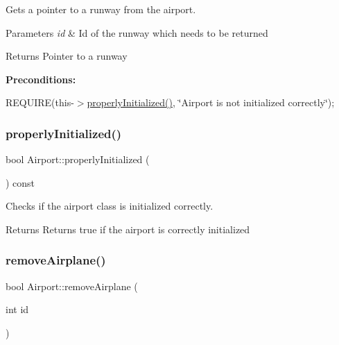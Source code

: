Gets a pointer to a runway from the airport. 


\begin{DoxyParams}{Parameters}
{\em id} & Id of the runway which needs to be returned \\
\hline
\end{DoxyParams}
\begin{DoxyReturn}{Returns}
Pointer to a runway
\end{DoxyReturn}
{\bfseries Preconditions\+:}
\begin{DoxyItemize}
\item R\+E\+Q\+U\+I\+RE(this-\/$>$\mbox{\hyperlink{class_airport_aa13e68ac58e8875837fbe888325cfff6}{properly\+Initialized()}}, \char`\"{}\+Airport is not initialized correctly\char`\"{}); 
\end{DoxyItemize}\mbox{\label{class_airport_aa13e68ac58e8875837fbe888325cfff6}} 
\subsubsection{\texorpdfstring{properly\+Initialized()}{properlyInitialized()}}
{\footnotesize\ttfamily bool Airport\+::properly\+Initialized (\begin{DoxyParamCaption}{ }\end{DoxyParamCaption}) const}



Checks if the airport class is initialized correctly. 

\begin{DoxyReturn}{Returns}
Returns true if the airport is correctly initialized 
\end{DoxyReturn}
\mbox{\label{class_airport_a4e4929a17d410aac86d2d518648e4284}} 
\subsubsection{\texorpdfstring{remove\+Airplane()}{removeAirplane()}}
{\footnotesize\ttfamily bool Airport\+::remove\+Airplane (\begin{DoxyParamCaption}\item[{int}]{id }\end{DoxyParamCaption})}



